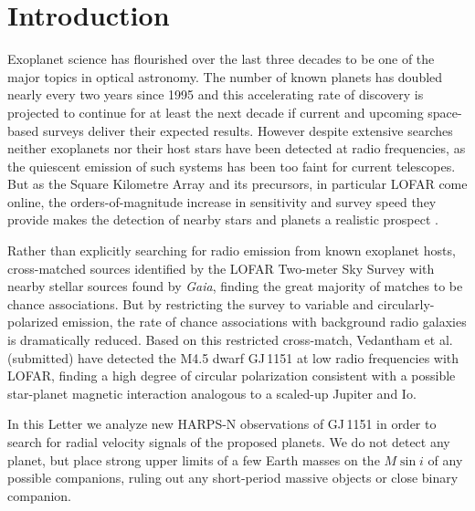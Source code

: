 \documentclass[modern]{aastex62}
\newcommand{\gaia}{\textit{Gaia}\xspace}
\begin{document}


\section{Introduction} 
\label{sec:intro}

Exoplanet science has flourished over the last three decades to be one of the major topics in optical astronomy. The number of known planets has doubled nearly every two years since 1995 \citep{Mamajek2016} and this accelerating rate of discovery is projected to continue for at least the next decade if current and upcoming space-based surveys deliver their expected results. However despite extensive searches \citep{2000ApJ...545.1058B,2013A&A...552A..65L,2018MNRAS.tmp.1077L} neither exoplanets nor their host stars have been detected at radio frequencies, as the quiescent emission of such systems has been too faint for current telescopes. But as the Square Kilometre Array \citep[SKA;][]{2009IEEEP..97.1482D} and its precursors, in particular LOFAR \citep[the LOw-Frequency ARray:][]{lofar} come online, the orders-of-magnitude increase in sensitivity and survey speed they provide makes the detection of nearby stars and planets a realistic prospect \citep{pope19}. 

Rather than explicitly searching for radio emission from known exoplanet hosts, \citet{Callingham_2019} cross-matched sources identified by the LOFAR Two-meter Sky Survey \citep[LoTSS:][]{lotss} with nearby stellar sources found by \gaia, finding the great majority of matches to be chance associations. But by restricting the survey to variable and circularly-polarized emission, the rate of chance associations with background radio galaxies is dramatically reduced. Based on this restricted cross-match, Vedantham et al. (submitted) have detected the M4.5 dwarf GJ\,1151 at low radio frequencies with LOFAR, finding a high degree of circular polarization consistent with a possible star-planet magnetic interaction analogous to a scaled-up Jupiter and Io. 

In this Letter we analyze new HARPS-N \citep[High Accuracy Radial velocity Planet Searcher:][]{harpsn} observations of GJ\,1151 in order to search for radial velocity signals of the proposed planets. We do not detect any planet, but place strong upper limits of a few Earth masses on the $M\sin{i}$ of any possible companions, ruling out any short-period massive objects or close binary companion.  
\end{document}
